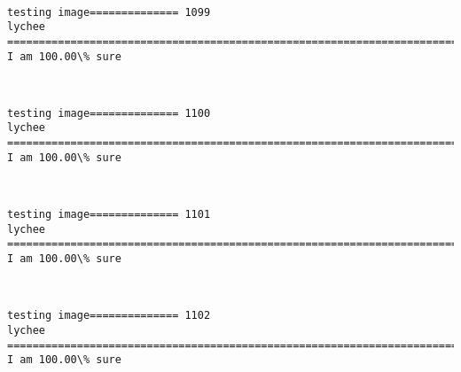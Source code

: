 \documentclass[11pt]{article}
\begin{document}
    \begin{center}
    \end{center}
    { \hspace*{\fill} \\}
    
    \begin{Verbatim}[commandchars=\\\{\}]
testing image============== 1099
lychee
============================================================================
I am 100.00\% sure

    \end{Verbatim}

    \begin{center}
    \end{center}
    { \hspace*{\fill} \\}
    
    \begin{Verbatim}[commandchars=\\\{\}]
testing image============== 1100
lychee
============================================================================
I am 100.00\% sure

    \end{Verbatim}

    \begin{center}
    \end{center}
    { \hspace*{\fill} \\}
    
    \begin{Verbatim}[commandchars=\\\{\}]
testing image============== 1101
lychee
============================================================================
I am 100.00\% sure

    \end{Verbatim}

    \begin{center}
    \end{center}
    { \hspace*{\fill} \\}
    
    \begin{Verbatim}[commandchars=\\\{\}]
testing image============== 1102
lychee
============================================================================
I am 100.00\% sure

    \end{Verbatim}
\end{document}
